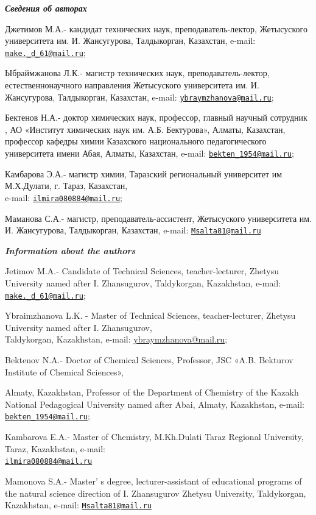 \begin{authorinfo}
\hspace{1em}\emph{{\bfseries Сведения об авторах}}

Джетимов М.А.- кандидат технических наук, преподаватель-лектор,
Жетысуского университета им. И. Жансугурова, Талдыкорган, Казахстан,
e-mail:
\href{mailto:make._d_61@mail.ru}{\nolinkurl{make.\_d\_61@mail.ru}};

Ыбраймжанова Л.К.- магистр технических наук, преподаватель-лектор,
естественнонаучного направления Жетысуского университета им. И.
Жансугурова, Талдыкорган, Казахстан, e-mail:
\href{mailto:ybraymzhanova@mail.ru}{\nolinkurl{ybraymzhanova@mail.ru}};

Бектенов Н.А.- доктор химических наук, профессор, главный научный
сотрудник , АО «Институт химических наук им. А.Б. Бектурова», Алматы,
Казахстан, профессор кафедры химии Казахского национального
педагогического университета имени Абая, Алматы, Казахстан, e-mail:
\href{mailto:bekten_1954@mail.ru}{\nolinkurl{bekten\_1954@mail.ru}};

Камбарова Э.А.- магистр химии, Таразский региональный университет им
М.Х.Дулати, г. Тараз, Казахстан, \\e-mail:
\href{mailto:ilmira080884@mail.ru}{\nolinkurl{ilmira080884@mail.ru}};

Маманова С.А.- магистр, преподаватель-ассистент, Жетысуского
университета им. И. Жансугурова, Талдыкорган, Казахстан, e-mail:
\href{mailto:Msalta81@mail.ru}{\nolinkurl{Msalta81@mail.ru}}

\hspace{1em}\emph{{\bfseries Information about the authors}}

Jetimov M.A.- Candidate of Technical Sciences, teacher-lecturer, Zhetysu
University named after I. Zhansugurov, Taldykorgan, Kazakhstan, e-mail:
\href{mailto:make._d_61@mail.ru}{\nolinkurl{make.\_d\_61@mail.ru}};

Ybraimzhanova L.K. - Master of Technical Sciences, teacher-lecturer,
Zhetysu University named after I. Zhansugurov, \\ Taldykorgan, Kazakhstan,
e-mail: \href{mailto:ybraymzhanova@mail.ruu}{ybraymzhanova@mail.ru};

Bektenov N.A.- Doctor of Chemical Sciences, Professor, JSC «A.B.
Bekturov Institute of Chemical Sciences»,

Almaty, Kazakhstan, Professor of the Department of Chemistry of the
Kazakh National Pedagogical University named after Abai, Almaty,
Kazakhstan, e-mail:
\href{mailto:bekten_1954@mail.ru}{\nolinkurl{bekten\_1954@mail.ru}};

Kambarova E.A.- Master of Chemistry, M.Kh.Dulati Taraz Regional
University, Taraz, Kazakhstan, e-mail:
\\\href{mailto:ilmira080884@mail.ru}{\nolinkurl{ilmira080884@mail.ru}}

Mamonova S.A.- Master' s degree, lecturer-assistant of
educational programs of the natural science direction of I. Zhansugurov
Zhetysu University, Taldykorgan, Kazakhstan, e-mail:
\href{mailto:Msalta81@mail.ru}{\nolinkurl{Msalta81@mail.ru}}
\end{authorinfo}

